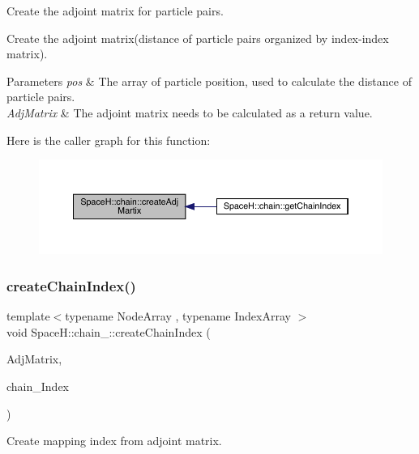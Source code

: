 Create the adjoint matrix for particle pairs. 

Create the adjoint matrix(distance of particle pairs organized by index-\/index matrix). 
\begin{DoxyParams}{Parameters}
{\em pos} & The array of particle position, used to calculate the distance of particle pairs. \\
\hline
{\em Adj\+Matrix} & The adjoint matrix needs to be calculated as a return value. \\
\hline
\end{DoxyParams}
Here is the caller graph for this function\+:\nopagebreak
\begin{figure}[H]
\begin{center}
\leavevmode
\includegraphics[width=350pt]{namespace_space_h_1_1chain_a8d2f8c8026f24294d16309c4f2e11fdb_icgraph}
\end{center}
\end{figure}
\mbox{\label{namespace_space_h_1_1chain_a65d906373401066033d8e4a6ad581cce}} 
\subsubsection{\texorpdfstring{create\+Chain\+Index()}{createChainIndex()}}
{\footnotesize\ttfamily template$<$typename Node\+Array , typename Index\+Array $>$ \\
void Space\+H\+::chain_\+::create\+Chain\+Index (\begin{DoxyParamCaption}\item[{Node\+Array \&}]{Adj\+Matrix,  }\item[{Index\+Array \&}]{chain_\+Index }\end{DoxyParamCaption})}



Create mapping index from adjoint matrix. 

